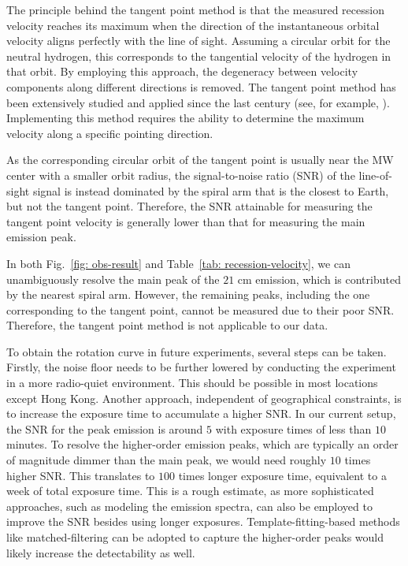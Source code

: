 \documentclass[12pt]{article}
\begin{document}
    The principle behind the tangent point method is that the measured recession velocity reaches its maximum when the direction of the instantaneous orbital velocity aligns perfectly with the line of sight. Assuming a circular orbit for the neutral hydrogen, this corresponds to the tangential velocity of the hydrogen in that orbit. By employing this approach, the degeneracy between velocity components along different directions is removed. 
    The tangent point method has been extensively studied and applied since the last century (see, for example, \cite{tangent-point-method-review,rotation-curve-review,tangent-point-method-systematics,tangent-point-method-systematics-2}). Implementing this method requires the ability to determine the maximum velocity along a specific pointing direction.
    
    As the corresponding circular orbit of the tangent point is usually near the MW center with a smaller orbit radius, the signal-to-noise ratio (SNR) of the line-of-sight signal is instead dominated by the spiral arm that is the closest to Earth, but not the tangent point. 
    Therefore, the SNR attainable for measuring the tangent point velocity is generally lower than that for measuring the main emission peak.
    
    In both Fig.~\ref{fig: obs-result} and Table~\ref{tab: recession-velocity}, we can unambiguously resolve the main peak of the $21$ cm emission, which is contributed by the nearest spiral arm. However, the remaining peaks, including the one corresponding to the tangent point, cannot be measured due to their poor SNR. Therefore, the tangent point method is not applicable to our data.
    
    To obtain the rotation curve in future experiments, several steps can be taken. Firstly, the noise floor needs to be further lowered by conducting the experiment in a more radio-quiet environment. This should be possible in most locations except Hong Kong. Another approach, independent of geographical constraints, is to increase the exposure time to accumulate a higher SNR. 
    In our current setup, the SNR for the peak emission is around $5$ with exposure times of less than $10$ minutes. 
    To resolve the higher-order emission peaks, which are typically an order of magnitude dimmer than the main peak, we would need roughly $10$ times higher SNR. 
    This translates to $100$ times longer exposure time, equivalent to a week of total exposure time. This is a rough estimate, as more sophisticated approaches, such as modeling the emission spectra, can also be employed to improve the SNR besides using longer exposures. 
    Template-fitting-based methods like matched-filtering can be adopted to capture the higher-order peaks would likely increase the detectability as well.
    
\end{document}
